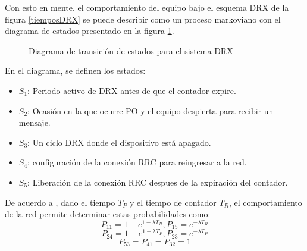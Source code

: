 \documentclass[journal]{IEEEtran}
\begin{document}
Con esto en mente, el comportamiento del equipo bajo el esquema DRX de la figura \ref{tiemposDRX} se puede describir como un proceso markoviano con el diagrama de estados presentado en la figura \ref{estadosDRX}.

\begin{figure}[h]
\centering
{}
\caption{Diagrama de transición de estados para el sistema DRX}
\label{estadosDRX}
\end{figure}

En el diagrama, se definen los estados:\\

\begin{itemize}
	\item $S_{1}$: Periodo activo de DRX antes de que el contador expire.
	\item $S_{2}$: Ocasión en la que ocurre PO y el equipo despierta para recibir un mensaje.
	\item $S_{3}$: Un ciclo DRX donde el dispositivo está apagado.
	\item $S_{4}$: configuración de la conexión RRC para reingresar a la red.
	\item $S_{5}$: Liberación de la conexión RRC despues de la expiración del contador.
\end{itemize}

De acuerdo a \cite{paper2}, dado el tiempo $T_{P}$ y el tiempo de contador $T_{R}$, el comportamiento de la red permite determinar estas probabilidades como:\\

\begin{equation}
P_{11}=1-e^{1-\lambda T_{R}}, P_{15}=e^{-\lambda T_{R}}
\end{equation}
\begin{equation}
P_{24}=1-e^{1-\lambda T_{P}}, P_{23}=e^{-\lambda T_{P}}
\end{equation}
\begin{equation}
P_{53}=P_{41}=P_{32}=1
\end{equation}
\end{document}
